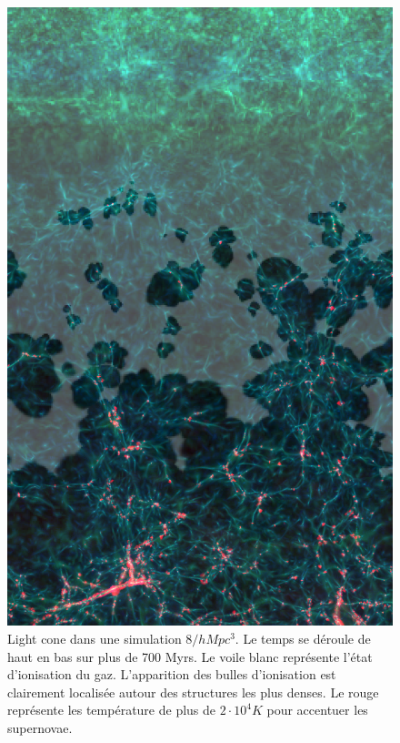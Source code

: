 \begin{figure}[bth]
        \includegraphics[height=.90\textheight]{img/04/frise_wall.png} 
        \caption{Light cone dans une simulation $8/h Mpc ^3$. 
        Le temps se déroule de haut en bas sur plus de 700 Myrs.
        Le voile blanc représente l'état d'ionisation du gaz.
        L'apparition des bulles d'ionisation est clairement localisée autour des structures les plus denses.
        Le rouge représente les température de plus de $2\cdot 10^4K$ pour accentuer les supernovae. 
 }
 		\label{fig:lightcone}
\end{figure}

